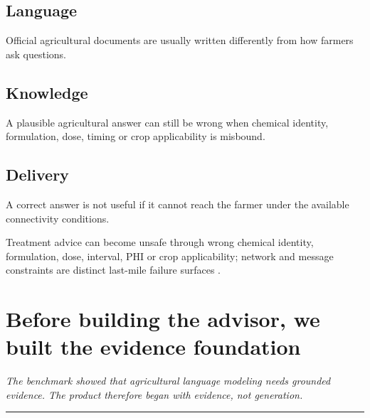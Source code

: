 \documentclass[11pt,a4paper]{article}
\newcommand{\takeaway}[1]{{\color{kcgrey}\itshape\large #1}\par\vspace{2pt}%
  {\color{kcline}\rule{\linewidth}{0.8pt}}\par\vspace{6pt}}
\newcommand{\srcfoot}[1]{\par\vspace{4pt}{\color{kcline}\rule{\linewidth}{0.4pt}}\par
  {\footnotesize\color{kcgrey}#1}\par}
\begin{document}
\begin{center}
\end{center}

\subsection*{Language}
Official agricultural documents are usually written differently from how farmers
ask questions.

\subsection*{Knowledge}
A plausible agricultural answer can still be wrong when chemical identity,
formulation, dose, timing or crop applicability is misbound.

\subsection*{Delivery}
A correct answer is not useful if it cannot reach the farmer under the available
connectivity conditions.

\srcfoot{Treatment advice can become unsafe through wrong chemical identity, formulation, dose, interval, PHI or crop applicability; network and message constraints are distinct last-mile failure surfaces \cite{cea_manuscript}.}

\newpage
\section*{\color{kcgreen}Before building the advisor, we built the evidence foundation}
\takeaway{The benchmark showed that agricultural language modeling needs grounded evidence. The product therefore began with evidence, not generation.}
\end{document}

